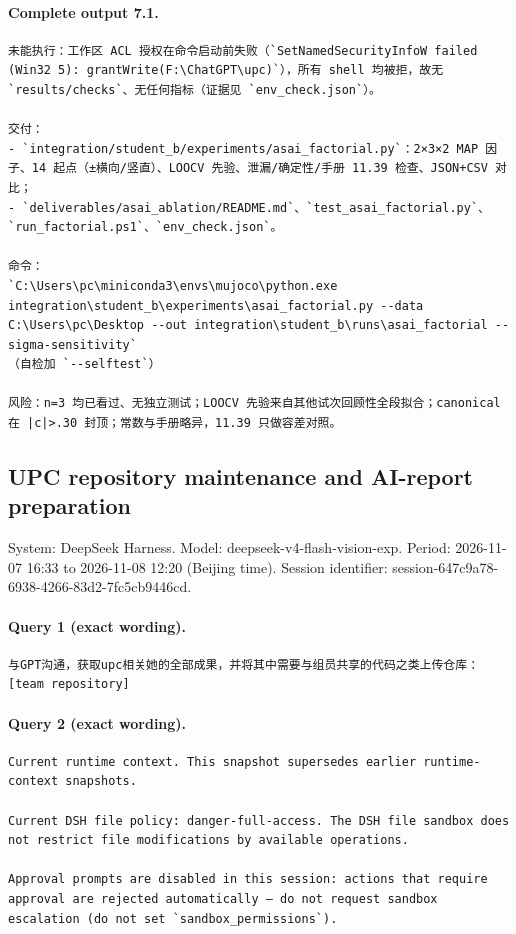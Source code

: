 \documentclass[UTF8,10pt]{ctexart}
\begin{document}
\paragraph{Complete output 7.1.}
\begin{Verbatim}[breaklines=true,breakanywhere=true,fontsize=\scriptsize,frame=single,framesep=2pt]
未能执行：工作区 ACL 授权在命令启动前失败（`SetNamedSecurityInfoW failed (Win32 5): grantWrite(F:\ChatGPT\upc)`），所有 shell 均被拒，故无 `results/checks`、无任何指标（证据见 `env_check.json`）。

交付：
- `integration/student_b/experiments/asai_factorial.py`：2×3×2 MAP 因子、14 起点（±横向/竖直）、LOOCV 先验、泄漏/确定性/手册 11.39 检查、JSON+CSV 对比；
- `deliverables/asai_ablation/README.md`、`test_asai_factorial.py`、`run_factorial.ps1`、`env_check.json`。

命令：
`C:\Users\pc\miniconda3\envs\mujoco\python.exe integration\student_b\experiments\asai_factorial.py --data C:\Users\pc\Desktop --out integration\student_b\runs\asai_factorial --sigma-sensitivity`
（自检加 `--selftest`）

风险：n=3 均已看过、无独立测试；LOOCV 先验来自其他试次回顾性全段拟合；canonical 在 |c|>.30 封顶；常数与手册略异，11.39 只做容差对照。
\end{Verbatim}

\subsection*{UPC repository maintenance and AI-report preparation}
\noindent System: DeepSeek Harness. Model: deepseek-v4-flash-vision-exp. Period: 2026-11-07 16:33 to 2026-11-08 12:20 (Beijing time). Session identifier: session-647c9a78-6938-4266-83d2-7fc5cb9446cd.

\paragraph{Query 1 (exact wording).}
\begin{Verbatim}[breaklines=true,breakanywhere=true,fontsize=\scriptsize,frame=single,framesep=2pt]
与GPT沟通，获取upc相关她的全部成果，并将其中需要与组员共享的代码之类上传仓库：[team repository]
\end{Verbatim}

\paragraph{Query 2 (exact wording).}
\begin{Verbatim}[breaklines=true,breakanywhere=true,fontsize=\scriptsize,frame=single,framesep=2pt]
Current runtime context. This snapshot supersedes earlier runtime-context snapshots.

Current DSH file policy: danger-full-access. The DSH file sandbox does not restrict file modifications by available operations.

Approval prompts are disabled in this session: actions that require approval are rejected automatically — do not request sandbox escalation (do not set `sandbox_permissions`).
\end{Verbatim}
\end{document}
